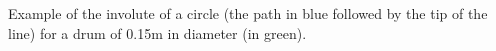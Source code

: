 \label{fig:spiral} Example of the involute of a circle (the path in blue followed by the tip of the line) for a drum of 0.15m in diameter (in green).